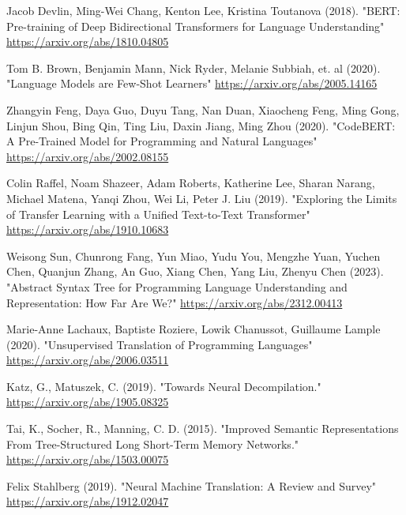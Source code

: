 \documentclass{dhbenelux}
\begin{document}
\begin{thebibliography}{99}

Jacob Devlin, Ming-Wei Chang, Kenton Lee, Kristina Toutanova (2018). "BERT: Pre-training of Deep Bidirectional Transformers for Language Understanding"
\href{https://arxiv.org/abs/1810.04805}{https://arxiv.org/abs/1810.04805}

Tom B. Brown, Benjamin Mann, Nick Ryder, Melanie Subbiah, et. al (2020). "Language Models are Few-Shot Learners"
\href{https://arxiv.org/abs/2005.14165}{https://arxiv.org/abs/2005.14165}

Zhangyin Feng, Daya Guo, Duyu Tang, Nan Duan, Xiaocheng Feng, Ming Gong, Linjun Shou, Bing Qin, Ting Liu, Daxin Jiang, Ming Zhou (2020). "CodeBERT: A Pre-Trained Model for Programming and Natural Languages"
\href{https://arxiv.org/abs/2002.08155}{https://arxiv.org/abs/2002.08155}

Colin Raffel, Noam Shazeer, Adam Roberts, Katherine Lee, Sharan Narang, Michael Matena, Yanqi Zhou, Wei Li, Peter J. Liu (2019). "Exploring the Limits of Transfer Learning with a Unified Text-to-Text Transformer"
\href{https://arxiv.org/abs/1910.10683}{https://arxiv.org/abs/1910.10683}

Weisong Sun, Chunrong Fang, Yun Miao, Yudu You, Mengzhe Yuan, Yuchen Chen, Quanjun Zhang, An Guo, Xiang Chen, Yang Liu, Zhenyu Chen (2023). "Abstract Syntax Tree for Programming Language Understanding and Representation: How Far Are We?" \href{https://arxiv.org/abs/2312.00413}{https://arxiv.org/abs/2312.00413}

Marie-Anne Lachaux, Baptiste Roziere, Lowik Chanussot, Guillaume Lample (2020). "Unsupervised Translation of Programming Languages" \href{https://arxiv.org/abs/2006.03511}{https://arxiv.org/abs/2006.03511}

Katz, G., Matuszek, C. (2019). "Towards Neural Decompilation." 
\href{https://arxiv.org/abs/1905.08325}{https://arxiv.org/abs/1905.08325}

Tai, K., Socher, R., Manning, C. D. (2015). "Improved Semantic Representations From Tree-Structured Long Short-Term Memory Networks." \href{https://arxiv.org/abs/1503.00075}{https://arxiv.org/abs/1503.00075}

Felix Stahlberg (2019). "Neural Machine Translation: A Review and Survey"
\href{https://arxiv.org/abs/1912.02047}{https://arxiv.org/abs/1912.02047}


\end{thebibliography}
\end{document}
